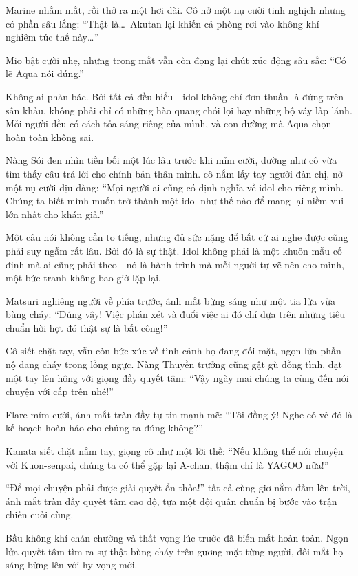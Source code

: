 \documentclass[../main.tex]{subfiles}
\begin{document}
Marine nhắm mắt, rồi thở ra một hơi dài. Cô nở một nụ cười tinh nghịch nhưng có phần sâu lắng: ``Thật là\dots\ Akutan lại khiến cả phòng rơi vào không khí nghiêm túc thế này\dots''

Mio bật cười nhẹ, nhưng trong mắt vẫn còn đọng lại chút xúc động sâu sắc: ``Có lẽ Aqua nói đúng.''

Không ai phản bác. Bởi tất cả đều hiểu - idol không chỉ đơn thuần là đứng trên sân khấu, không phải chỉ có những hào quang chói lọi hay những bộ váy lấp lánh. Mỗi người đều có cách tỏa sáng riêng của mình, và con đường mà Aqua chọn hoàn toàn không sai.

Nàng Sói đen nhìn tiền bối một lúc lâu trước khi mỉm cười, dường như cô vừa tìm thấy câu trả lời cho chính bản thân mình. cô nắm lấy tay người đàn chị, nở một nụ cười dịu dàng: ``Mọi người ai cũng có định nghĩa về idol cho riêng mình. Chúng ta biết mình muốn trở thành một idol như thế nào để mang lại niềm vui lớn nhất cho khán giả.''

Một câu nói không cần to tiếng, nhưng đủ sức nặng để bất cứ ai nghe được cũng phải suy ngẫm rất lâu. Bởi đó là sự thật. Idol không phải là một khuôn mẫu cố định mà ai cũng phải theo - nó là hành trình mà mỗi người tự vẽ nên cho mình, một bức tranh không bao giờ lặp lại.

Matsuri nghiêng người về phía trước, ánh mắt bừng sáng như một tia lửa vừa bùng cháy: ``Đúng vậy! Việc phán xét và đuổi việc ai đó chỉ dựa trên những tiêu chuẩn hời hợt đó thật sự là bất công!''

Cô siết chặt tay, vẫn còn bức xúc về tình cảnh họ đang đối mặt, ngọn lửa phẫn nộ đang cháy trong lồng ngực. Nàng Thuyền trưởng cũng gật gù đồng tình, đặt một tay lên hông với giọng đầy quyết tâm: ``Vậy ngày mai chúng ta cùng đến nói chuyện với cấp trên nhé!''

Flare mỉm cười, ánh mắt tràn đầy tự tin mạnh mẽ: ``Tôi đồng ý! Nghe có vẻ đó là kế hoạch hoàn hảo cho chúng ta đúng không?''

Kanata siết chặt nắm tay, giọng cô như một lời thề: ``Nếu không thể nói chuyện với Kuon-senpai, chúng ta có thể gặp lại A-chan, thậm chí là YAGOO nữa!''

``Để mọi chuyện phải được giải quyết ổn thỏa!'' tất cả cùng giơ nắm đấm lên trời, ánh mắt tràn đầy quyết tâm cao độ, tựa một đội quân chuẩn bị bước vào trận chiến cuối cùng.

Bầu không khí chán chường và thất vọng lúc trước đã biến mất hoàn toàn. Ngọn lửa quyết tâm tìm ra sự thật bùng cháy trên gương mặt từng người, đôi mắt họ sáng bừng lên với hy vọng mới.
\end{document}
